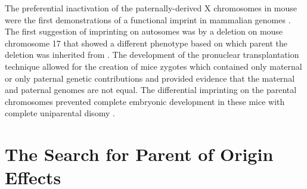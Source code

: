 The preferential inactivation of the paternally-derived X chromosomes in mouse were the first demonstrations of a functional imprint in mammalian genomes \cite{Takagi:1975ua,Lyon:1984gh,Chandra:1975tb}. The first suggestion of imprinting on autosomes was by a deletion on mouse chromosome 17 that showed a different phenotype based on which parent the deletion was inherited from \cite{Johnson:1974uf,Johnson:1974kc}. The development of the pronuclear transplantation technique allowed for the creation of mice zygotes which contained only maternal or only paternal genetic contributions and provided evidence that the maternal and paternal genomes are not equal. The differential imprinting on the parental chromosomes prevented complete embryonic development in these mice with complete uniparental disomy \cite{Sapienza:1989vm,McGrath:1984ky}.



\section{The Search for Parent of Origin Effects}


